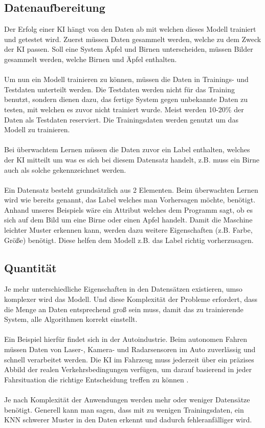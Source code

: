 \documentclass[12pt,oneside,a4paper,parskip]{scrbook}
\begin{document}
\subsection{Datenaufbereitung}
\label{section:dataSetup}
Der Erfolg einer KI hängt von den Daten ab mit welchen dieses Modell trainiert und getestet wird. Zuerst müssen Daten gesammelt werden, welche zu dem Zweck der KI passen. Soll eine System Äpfel und Birnen unterscheiden, müssen Bilder gesammelt werden, welche Birnen und Äpfel enthalten.
\\\\
Um nun ein Modell trainieren zu können, müssen die Daten in Trainings- und Testdaten unterteilt werden. Die Testdaten werden nicht für das Training benutzt, sondern dienen dazu, das fertige System gegen unbekannte Daten zu testen, mit welchen es zuvor nicht trainiert wurde. Meist werden 10-20\% der Daten als Testdaten reserviert. Die Trainingsdaten werden genutzt um das Modell zu trainieren.
\\\\
Bei überwachtem Lernen müssen die Daten zuvor ein Label enthalten, welches der KI mitteilt um was es sich bei diesem Datensatz handelt, z.B. muss ein Birne auch als solche gekennzeichnet werden.
\\\\
Ein Datensatz besteht grundsätzlich aus 2 Elementen. Beim überwachten Lernen wird wie bereits genannt, das Label welches man Vorhersagen möchte, benötigt. Anhand unseres Beispiels wäre ein Attribut welches dem Programm sagt, ob es sich auf dem Bild um eine Birne oder einen Apfel handelt. Damit die Maschine leichter Muster erkennen kann, werden dazu weitere Eigenschaften (z.B. Farbe, Größe) benötigt. Diese helfen dem Modell z.B. das Label richtig vorherzusagen.

\subsection{Quantität}
\label{section:DataQuantity}
Je mehr unterschiedliche Eigenschaften in den Datensätzen existieren, umso komplexer wird das Modell. Und diese Komplexität der Probleme erfordert, dass die Menge an Daten entsprechend groß sein muss, damit das zu trainierende System, alle Algorithmen korrekt einstellt.
\\\\
Ein Beispiel hierfür findet sich in der Autoindustrie. Beim autonomen Fahren müssen Daten von Laser-, Kamera- und Radarsensoren im Auto zuverlässig und schnell verarbeitet werden. Die KI im Fahrzeug muss jederzeit über ein präzises Abbild der realen Verkehrsbedingungen verfügen, um darauf basierend in jeder Fahrsituation die richtige Entscheidung treffen zu können \cite{autonomesFahren}.
\\\\
Je nach Komplexität der Anwendungen werden mehr oder weniger Datensätze benötigt. Generell kann man sagen, dass mit zu wenigen Trainingsdaten, ein KNN schwerer Muster in den Daten erkennt und dadurch fehleranfälliger wird.
\end{document}
